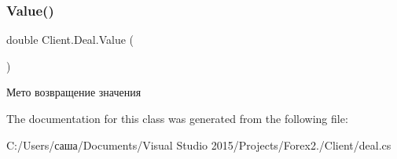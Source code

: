 \subsubsection{\texorpdfstring{Value()}{Value()}}
{\footnotesize\ttfamily double Client.\+Deal.\+Value (\begin{DoxyParamCaption}{ }\end{DoxyParamCaption})\hspace{0.3cm}{\ttfamily [inline]}}



Мето возвращение значения 



The documentation for this class was generated from the following file\+:\begin{DoxyCompactItemize}
\item 
C\+:/\+Users/саша/\+Documents/\+Visual Studio 2015/\+Projects/\+Forex2./\+Client/deal.\+cs\end{DoxyCompactItemize}
